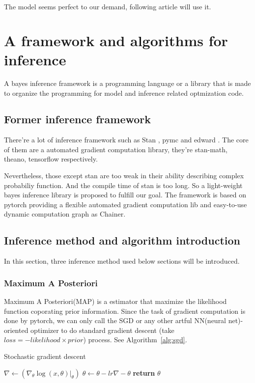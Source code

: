 \documentclass{article}
\begin{document}
The model seems perfect to our demand, following article will use it.

\section{A framework and algorithms for inference}

A bayes inference framework is a programming language or a library that is made to organize the 
programming for model and inference related optmization code.

\subsection{Former inference framework}

There're a lot of inference framework such as Stan \cite{carpenter2017stan}, 
pymc\cite{patil2010pymc} and edward \cite{tran2016edward}. 
The core of them are a automated gradient computation library, 
they're stan-math, theano, tensorflow respectively. 

Nevertheless, those except stan are too weak in their ability describing complex probabiliy function.
And the compile time of stan is too long. So a light-weight bayes inference library is proposed to 
fulfill our goal. The framework is based on pytorch providing a flexible automated gradient computation lib and easy-to-use 
dynamic computation graph as Chainer.

\subsection{Inference method and algorithm introduction}

In this section, three inference method used below sections will be introduced.

\subsubsection{Maximum A Posteriori}

Maximum A Posteriori(MAP) is a estimator that maximize the likelihood function 
coporating prior information. Since the task of gradient computation is done by pytorch, 
we can only call the SGD or any other artful NN(neural net)-oriented optimizer to do standard gradient 
descent (take $loss = -likelihood \times prior$) process. See Algorithm~\ref{alg:sgd}.


\begin{algorithm}
\caption{Stochastic gradient descent}
\begin{algorithmic}[1]
        \State $\nabla \gets (\nabla_\theta \log(x,\theta)|_{\theta})$
        \State $\theta \gets \theta - lr \nabla -\theta$
    \EndFor
    \State \textbf{return} $\theta$
\EndProcedure
\end{algorithmic}
\label{alg:sgd}
\end{algorithm}
\end{document}
